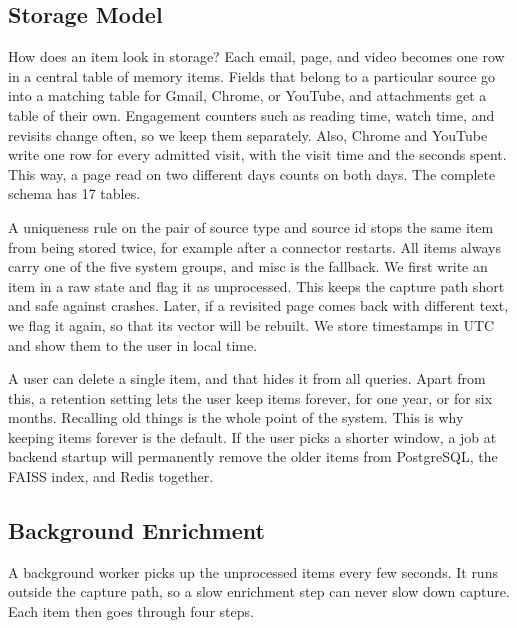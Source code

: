 \documentclass[conference]{IEEEtran}
\begin{document}
\subsection{Storage Model}
How does an item look in storage? Each email, page, and video becomes one row in a central table of memory items. Fields that belong to a particular source go into a matching table for Gmail, Chrome, or YouTube, and attachments get a table of their own. Engagement counters such as reading time, watch time, and revisits change often, so we keep them separately. Also, Chrome and YouTube write one row for every admitted visit, with the visit time and the seconds spent. This way, a page read on two different days counts on both days. The complete schema has 17 tables.

A uniqueness rule on the pair of source type and source id stops the same item from being stored twice, for example after a connector restarts. All items always carry one of the five system groups, and misc is the fallback. We first write an item in a raw state and flag it as unprocessed. This keeps the capture path short and safe against crashes. Later, if a revisited page comes back with different text, we flag it again, so that its vector will be rebuilt. We store timestamps in UTC and show them to the user in local time.

A user can delete a single item, and that hides it from all queries. Apart from this, a retention setting lets the user keep items forever, for one year, or for six months. Recalling old things is the whole point of the system. This is why keeping items forever is the default. If the user picks a shorter window, a job at backend startup will permanently remove the older items from PostgreSQL, the FAISS index, and Redis together.

\subsection{Background Enrichment}
A background worker picks up the unprocessed items every few seconds. It runs outside the capture path, so a slow enrichment step can never slow down capture. Each item then goes through four steps.
\end{document}
